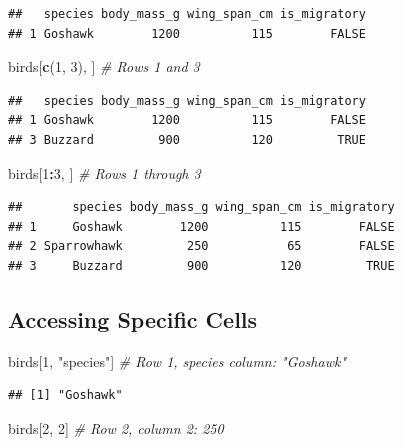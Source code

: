 \documentclass[
]{article}
\newenvironment{Shaded}{\begin{snugshade}}{\end{snugshade}}
\newcommand{\CommentTok}[1]{\textcolor[rgb]{0.56,0.35,0.01}{\textit{#1}}}
\newcommand{\DecValTok}[1]{\textcolor[rgb]{0.00,0.00,0.81}{#1}}
\newcommand{\FunctionTok}[1]{\textcolor[rgb]{0.13,0.29,0.53}{\textbf{#1}}}
\newcommand{\NormalTok}[1]{#1}
\newcommand{\SpecialCharTok}[1]{\textcolor[rgb]{0.81,0.36,0.00}{\textbf{#1}}}
\newcommand{\StringTok}[1]{\textcolor[rgb]{0.31,0.60,0.02}{#1}}
\begin{document}
\begin{verbatim}
##   species body_mass_g wing_span_cm is_migratory
## 1 Goshawk        1200          115        FALSE
\end{verbatim}

\begin{Shaded}
\begin{Highlighting}[]
\NormalTok{birds[}\FunctionTok{c}\NormalTok{(}\DecValTok{1}\NormalTok{, }\DecValTok{3}\NormalTok{), ]        }\CommentTok{\# Rows 1 and 3}
\end{Highlighting}
\end{Shaded}

\begin{verbatim}
##   species body_mass_g wing_span_cm is_migratory
## 1 Goshawk        1200          115        FALSE
## 3 Buzzard         900          120         TRUE
\end{verbatim}

\begin{Shaded}
\begin{Highlighting}[]
\NormalTok{birds[}\DecValTok{1}\SpecialCharTok{:}\DecValTok{3}\NormalTok{, ]            }\CommentTok{\# Rows 1 through 3}
\end{Highlighting}
\end{Shaded}

\begin{verbatim}
##       species body_mass_g wing_span_cm is_migratory
## 1     Goshawk        1200          115        FALSE
## 2 Sparrowhawk         250           65        FALSE
## 3     Buzzard         900          120         TRUE
\end{verbatim}

\subsection{Accessing Specific Cells}\label{accessing-specific-cells}

\begin{Shaded}
\begin{Highlighting}[]
\NormalTok{birds[}\DecValTok{1}\NormalTok{, }\StringTok{"species"}\NormalTok{]              }\CommentTok{\# Row 1, species column: "Goshawk"}
\end{Highlighting}
\end{Shaded}

\begin{verbatim}
## [1] "Goshawk"
\end{verbatim}

\begin{Shaded}
\begin{Highlighting}[]
\NormalTok{birds[}\DecValTok{2}\NormalTok{, }\DecValTok{2}\NormalTok{]                      }\CommentTok{\# Row 2, column 2: 250}
\end{Highlighting}
\end{Shaded}
\end{document}
